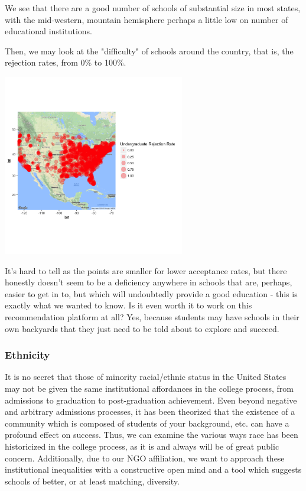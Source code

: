 \documentclass{article}\usepackage[]{graphicx}\usepackage[]{color}
\newenvironment{knitrout}{}{} %
\begin{document}
We see that there are a good number of schools of substantial size in most states, with the mid-western, mountain hemisphere perhaps a little low on number of educational institutions.\newline

Then, we may look at the "difficulty" of schools around the country, that is, the rejection rates, from 0\% to 100\%. 

\begin{knitrout}
\color{fgcolor}

{\centering \includegraphics[width=300px]{../images/ggmap-admissionRateDistribution} 

}



\end{knitrout}

It's hard to tell as the points are smaller for lower acceptance rates, but there honestly doesn't seem to be a deficiency anywhere in schools that are, perhaps, easier to get in to, but which will undoubtedly provide a good education - this is exactly what we wanted to know. Is it even worth it to work on this recommendation platform at all? Yes, because students may have schools in their own backyards that they just need to be told about to explore and succeed. 

\subsubsection{Ethnicity}

It is no secret that those of minority racial/ethnic status in the United States may not be given the same institutional affordances in the college process, from admissions to graduation to post-graduation achievement. Even beyond negative and arbitrary admissions processes, it has been theorized that the existence of a community which is composed of students of your background, etc. can have a profound effect on success. Thus, we can examine the various ways race has been historicized in the college process, as it is and always will be of great public concern. Additionally, due to our NGO affiliation, we want to approach these institutional inequalities with a constructive open mind and a tool which suggests schools of better, or at least matching, diversity. 
\end{document}
